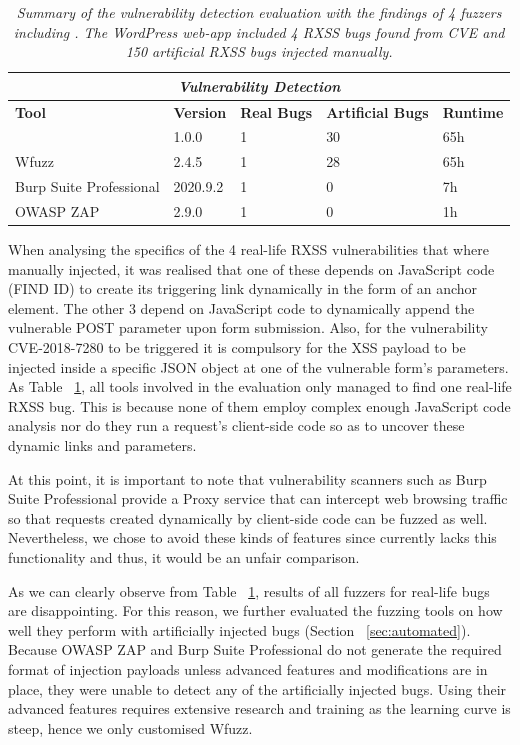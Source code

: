 \begin{table}[ht]
\centering
 \begin{tabular}{@{}|l|l|l|l|l|@{}}
 \hline
  \multicolumn{5}{|c|}{\textit{\textbf{Vulnerability Detection}}} \\
 \hline
 \textbf{Tool} & \textbf{Version} & \textbf{Real Bugs} & \textbf{Artificial Bugs} & \textbf{Runtime} \\ 
 \hline\hline
 \pname{} & 1.0.0 & 1 & 30 & 65h  \\ 
 \hline
 Wfuzz & 2.4.5 & 1 & 28 & 65h  \\ 
 \hline
 Burp Suite Professional & 2020.9.2 & 1 & 0 & 7h \\ 
 \hline
 OWASP ZAP  & 2.9.0 & 1 & 0 & 1h  \\
 \hline
 \end{tabular}
 \captionsetup{justification=centering}
 \caption[Vulnerability detection summary]{\textit{Summary of the vulnerability detection evaluation with the findings of 4 fuzzers including \pname{}. The WordPress web-app included 4 RXSS bugs found from CVE and 150 artificial RXSS bugs injected manually.}}

 \label{tools_table}
\end{table}

When analysing the specifics of the 4 real-life RXSS vulnerabilities that where manually injected, it was realised that one of these depends on JavaScript code (FIND ID) to create its triggering link dynamically in the form of an anchor element. The other 3 depend on JavaScript code to dynamically append the vulnerable POST parameter upon form submission. Also, for the vulnerability CVE-2018-7280 to be triggered it is compulsory for the XSS payload to be injected inside a specific JSON object at one of the vulnerable form's parameters. As Table ~\ref{tools_table}, all tools involved in the evaluation only managed to find one real-life RXSS bug. This is because none of them employ complex enough JavaScript code analysis nor do they run a request's client-side code so as to uncover these dynamic links and parameters.

At this point, it is important to note that vulnerability scanners such as Burp Suite Professional provide a Proxy service that can intercept web browsing traffic so that requests created dynamically by client-side code can be fuzzed as well. Nevertheless, we chose to avoid these kinds of features since \pname{} currently lacks this functionality and thus, it would be an unfair comparison.

As we can clearly observe from Table ~\ref{tools_table}, results of all fuzzers for real-life bugs are disappointing. For this reason, we further evaluated the fuzzing tools on how well they perform with artificially injected bugs (Section ~\ref{sec:automated}). Because OWASP ZAP and Burp Suite Professional do not generate the required format of injection payloads unless advanced features and modifications are in place, they were unable to detect any of the artificially injected bugs. Using their advanced features requires extensive research and training as the learning curve is steep, hence we only customised Wfuzz.

